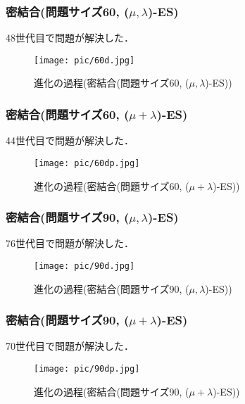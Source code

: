 \documentclass[a4j]{jarticle}
\begin{document}
\clearpage
\subsubsection*{密結合(問題サイズ60, ($\mu , \lambda$)-ES)}
48世代目で問題が解決した．
\begin{figure}[htb]
 \begin{center}
  \texttt{[image: pic/60d.jpg]}
  \caption{進化の過程(密結合(問題サイズ60, ($\mu , \lambda$)-ES))}
  \label{60d}
 \end{center}
\end{figure}

\subsubsection*{密結合(問題サイズ60, ($\mu + \lambda$)-ES)}
44世代目で問題が解決した．
\begin{figure}[htb]
 \begin{center}
  \texttt{[image: pic/60dp.jpg]}
  \caption{進化の過程(密結合(問題サイズ60, ($\mu + \lambda$)-ES))}
  \label{60dp}
 \end{center}
\end{figure}

\clearpage
\subsubsection*{密結合(問題サイズ90, ($\mu , \lambda$)-ES)}
76世代目で問題が解決した．
\begin{figure}[htb]
 \begin{center}
  \texttt{[image: pic/90d.jpg]}
  \caption{進化の過程(密結合(問題サイズ90, ($\mu , \lambda$)-ES))}
  \label{90d}
 \end{center}
\end{figure}

\subsubsection*{密結合(問題サイズ90, ($\mu + \lambda$)-ES)}
70世代目で問題が解決した．
\begin{figure}[htb]
 \begin{center}
  \texttt{[image: pic/90dp.jpg]}
  \caption{進化の過程(密結合(問題サイズ90, ($\mu + \lambda$)-ES))}
  \label{90dp}
 \end{center}
\end{figure}
\end{document}
